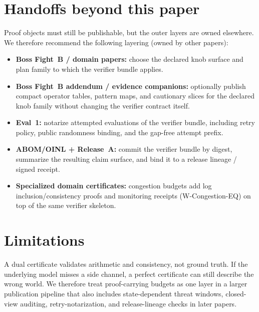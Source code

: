 \documentclass[11pt]{article}
\begin{document}
\section{Handoffs beyond this paper}
Proof objects must still be publishable, but the outer layers are owned elsewhere.
We therefore recommend the following layering (owned by other papers):
\begin{itemize}[leftmargin=*]
\item \textbf{Boss Fight~B / domain papers:} choose the declared knob surface and plan family to which the verifier bundle applies.\cite{series:bossfightb}
\item \textbf{Boss Fight~B addendum / evidence companions:} optionally publish compact operator tables, pattern maps, and cautionary slices for the declared knob family without changing the verifier contract itself.\cite{series:bossfightBaddendum}
\item \textbf{Eval~1:} notarize attempted evaluations of the verifier bundle, including retry policy, public randomness binding, and the gap-free attempt prefix.\cite{series:evalnotary}
\item \textbf{ABOM/OINL + Release~A:} commit the verifier bundle by digest, summarize the resulting claim surface, and bind it to a release lineage / signed receipt.\cite{series:abomoinl,series:releaseproperty}
\item \textbf{Specialized domain certificates:} congestion budgets add log inclusion/consistency proofs and monitoring receipts (W-Congestion-EQ) on top of the same verifier skeleton.\cite{series:wcongeq}
\end{itemize}

\section{Limitations}
A dual certificate validates arithmetic and consistency, not ground truth.
If the underlying model misses a side channel, a perfect certificate can still describe the wrong world.
We therefore treat proof-carrying budgets as one layer in a larger publication pipeline that also includes state-dependent threat windows, closed-view auditing, retry-notarization, and release-lineage checks in later papers.
\end{document}
